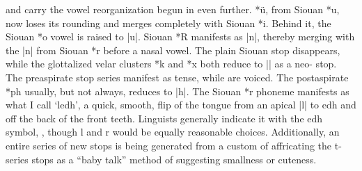 \documentclass[output=paper]{LSP/langsci}
\begin{document}
 and  carry the vowel reorganization begun in  even further.   *\"u, from Siouan *u, now loses its rounding and merges completely with Siouan *i.  Behind it, the Siouan *o vowel is raised to |u|.  Siouan *R manifests as |n|, thereby merging with the |n| from Siouan *r before a nasal vowel.  The plain Siouan  stop disappears, while the glottalized velar clusters *k\textsuperscript{} and *x\textsuperscript{} both reduce to |\textsuperscript{}| as a neo- stop.  The preaspirate stop series manifest as tense, while  are voiced.  The postaspirate *ph usually, but not always, reduces to |h|.  The Siouan *r phoneme manifests as what I call `ledh', a quick, smooth, flip of the tongue from an apical |l| to edh and off the back of the front teeth.  Linguists generally indicate it with the edh symbol, , though l and r would be equally reasonable choices.  Additionally, an entire series of new stops is being generated from a custom of affricating the t-series stops as a ``baby talk'' method of suggesting smallness or cuteness.
\end{document}
